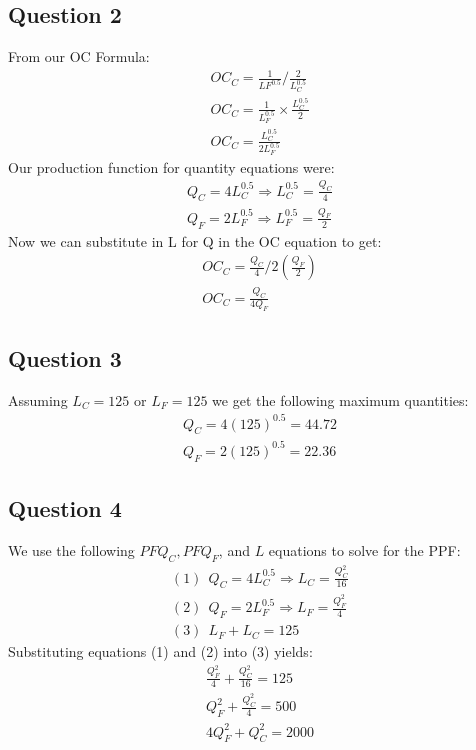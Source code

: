 \documentclass{article}
\begin{document}
\par \vspace{0.8em}
\subsection{Question 2}

From our OC Formula:
\begin{gather*}
  OC_{C} = \tfrac{1}{LF^{0.5}} / \tfrac{2}{L_{C}^{0.5}} \\
  OC_{C} = \tfrac{1}{L_{F}^{0.5}} \times \tfrac{L_{C}^{0.5}}{2} \\
  OC_{C} = \tfrac{L_{C}^{0.5}}{2L_{F}^{0.5}}
\end{gather*}
Our production function for quantity equations were:
\begin{gather*}
  Q_{C} = 4L_{C}^{0.5} \Rightarrow L_{C}^{0.5} = \tfrac{Q_{C}}{4} \\
  Q_{F} = 2L_{F}^{0.5} \Rightarrow L_{F}^{0.5} = \tfrac{Q_{F}}{2}
\end{gather*}
Now we can substitute in L for Q in the OC equation to get:
\begin{gather*}
  OC_{C} = \tfrac{Q_{C}}{4} / 2(\tfrac{Q_{F}}{2})  \\
  OC_{C} = \tfrac{Q_{C}}{4Q_{F}}
\end{gather*}

\par \vspace{0.8em}
\subsection{Question 3}

Assuming $L_{C} = 125$ or $L_{F} = 125$ we get the following maximum quantities:
\begin{gather*}
  Q_{C} = 4(125)^{0.5} = 44.72 \\
  Q_{F} = 2(125)^{0.5} = 22.36
\end{gather*}

\par \vspace{0.8em}
\subsection{Question 4}

We use the following $PFQ_{C}, PFQ_{F}$, and $L$ equations to solve for the PPF:
\begin{gather*}
  (1) \ \ Q_{C} = 4L_{C}^{0.5} \Rightarrow L_{C} = \tfrac{Q_{C}^{2}}{16} \\
  (2) \ \ Q_{F} = 2L_{F}^{0.5} \Rightarrow L_{F} = \tfrac{Q_{F}^{2}}{4} \\
  (3) \ \ L_{F} + L_{C} = 125
\end{gather*}
Substituting equations (1) and (2) into (3) yields:
\begin{gather*}
  \tfrac{Q_{F}^{2}}{4} + \tfrac{Q_{C}^{2}}{16} = 125 \\
  Q_{F}^{2} + \tfrac{Q_{C}^{2}}{4} = 500 \\
  4Q_{F}^{2} + Q_{C}^{2} = 2000
\end{gather*}
\end{document}
